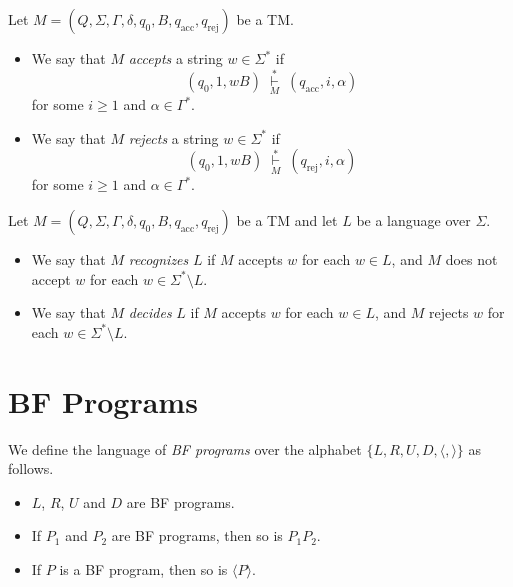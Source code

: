 \begin{definition}
  Let $M = (Q, \Sigma, \Gamma, \delta, q_0, B, q_\text{acc}, q_\text{rej})$ be
  a TM.
  \begin{itemize}
    \item We say that $M$ \emph{accepts} a string $w \in \Sigma^*$ if
    \begin{equation*}
      (q_0, 1, wB)
      \; \mathop\vdash\limits_M^* \;
      (q_\text{acc}, i, \alpha)
    \end{equation*}
    for some $i \geq 1$ and $\alpha \in \Gamma^*$.
    \item We say that $M$ \emph{rejects} a string $w \in \Sigma^*$ if
    \begin{equation*}
      (q_0, 1, wB)
      \; \mathop\vdash\limits_M^* \;
      (q_\text{rej}, i, \alpha)
    \end{equation*}
    for some $i \geq 1$ and $\alpha \in \Gamma^*$. 
  \end{itemize}
\end{definition}

\begin{definition}
  Let $M = (Q, \Sigma, \Gamma, \delta, q_0, B, q_\text{acc}, q_\text{rej})$ be
  a TM and let $L$ be a language over $\Sigma$.
  \begin{itemize}
    \item We say that $M$ \emph{recognizes} $L$ if $M$ accepts $w$ for each
    $w \in L$, and $M$ does not accept $w$ for each
    $w \in \Sigma^* \setminus L$.
    \item We say that $M$ \emph{decides} $L$ if $M$ accepts $w$ for each
    $w \in L$, and $M$ rejects $w$ for each $w \in \Sigma^* \setminus L$.
  \end{itemize}
\end{definition}

\section{BF Programs}
\begin{definition}
  We define the language of \emph{BF programs} over the alphabet
  $\{L, R, U, D, \langle, \rangle\}$ as follows.
  \begin{itemize}
    \item $L$, $R$, $U$ and $D$ are BF programs.
    \item If $P_1$ and $P_2$ are BF programs, then so is $P_1P_2$.
    \item If $P$ is a BF program, then so is $\langle P \rangle$.
  \end{itemize}
\end{definition}

